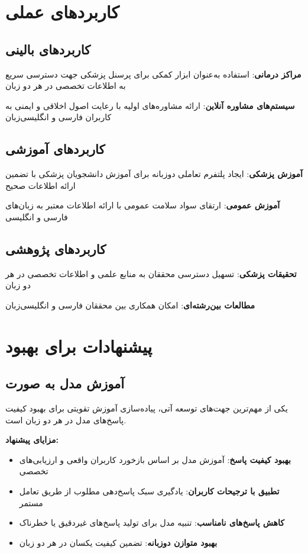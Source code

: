 \documentclass[11pt, a4paper, oneside]{book}
\begin{document}
	\section{کاربردهای عملی}

	\subsection{کاربردهای بالینی}
	\textbf{مراکز درمانی}: استفاده به‌عنوان ابزار کمکی برای پرسنل پزشکی جهت دسترسی سریع به اطلاعات تخصصی در هر دو زبان

	\textbf{سیستم‌های مشاوره آنلاین}: ارائه مشاوره‌های اولیه با رعایت اصول اخلاقی و ایمنی به کاربران فارسی و انگلیسی‌زبان

	\subsection{کاربردهای آموزشی}
	\textbf{آموزش پزشکی}: ایجاد پلتفرم تعاملی دوزبانه برای آموزش دانشجویان پزشکی با تضمین ارائه اطلاعات صحیح

	\textbf{آموزش عمومی}: ارتقای سواد سلامت عمومی با ارائه اطلاعات معتبر به زبان‌های فارسی و انگلیسی

	\subsection{کاربردهای پژوهشی}
	\textbf{تحقیقات پزشکی}: تسهیل دسترسی محققان به منابع علمی و اطلاعات تخصصی در هر دو زبان

	\textbf{مطالعات بین‌رشته‌ای}: امکان همکاری بین محققان فارسی و انگلیسی‌زبان

	\section{پیشنهادات برای بهبود}

	\subsection{آموزش مدل به صورت }

	یکی از مهم‌ترین جهت‌های توسعه آتی، پیاده‌سازی آموزش تقویتی برای بهبود کیفیت پاسخ‌های مدل در هر دو زبان است.

	\textbf{مزایای پیشنهاد:}
	\begin{itemize}
		\item \textbf{بهبود کیفیت پاسخ}: آموزش مدل بر اساس بازخورد کاربران واقعی و ارزیابی‌های تخصصی
		\item \textbf{تطبیق با ترجیحات کاربران}: یادگیری سبک پاسخ‌دهی مطلوب از طریق تعامل مستمر
		\item \textbf{کاهش پاسخ‌های نامناسب}: تنبیه مدل برای تولید پاسخ‌های غیردقیق یا خطرناک
		\item \textbf{بهبود متوازن دوزبانه}: تضمین کیفیت یکسان در هر دو زبان
	\end{itemize}
\end{document}

